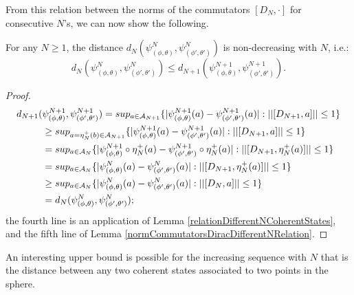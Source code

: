 From this relation between the norms of the commutators $[D_N, \cdot]$ for consecutive $N$'s, we can now show the following.

\begin{theorem}\label{nondecreasingDistanceRelatingNCoherent}
For any $N \geq 1$, the distance $d_N(\psi^N_{(\phi, \theta)}, \psi^N_{(\phi', \theta')})$ is non-decreasing with $N$, i.e.:
\begin{equation}
    d_N(\psi^N_{(\phi, \theta)}, \psi^N_{(\phi', \theta')}) \leq d_{N+1}(\psi^{N+1}_{(\phi, \theta)}, \psi^{N+1}_{(\phi', \theta')}).
\end{equation}
\end{theorem}
\begin{proof}
\begin{align*}
    d_{N+1}(&\psi^{N+1}_{(\phi, \theta)}, \psi^{N+1}_{(\phi', \theta')}) 
        = sup_{a \in \acal_{N+1}} \{|\psi^{N+1}_{(\phi, \theta)}(a) - \psi^{N+1}_{(\phi', \theta')}(a)| : ||[D_{N+1}, a]|| \leq 1\} \\
        &\geq sup_{a = \eta_N^+(b) \in \acal_{N+1}} \{|\psi^{N+1}_{(\phi, \theta)}(a) - \psi^{N+1}_{(\phi', \theta')}(a)| : ||[D_{N+1}, a]|| \leq 1\}\\
        &= sup_{a \in \acal_{N}} \{|\psi^{N+1}_{(\phi, \theta)}\circ \eta_N^+(a) - \psi^{N+1}_{(\phi', \theta')}\circ \eta_N^+(a)| : ||[D_{N+1},  \eta_N^+(a)]|| \leq 1\} \\
        &= sup_{a \in \acal_{N}} \{|\psi^{N}_{(\phi, \theta)}(a) - \psi^{N}_{(\phi', \theta')}(a)| : ||[D_{N+1}, \eta_N^+(a)]|| \leq 1\}\\
        &\geq sup_{a \in \acal_{N}} \{|\psi^{N}_{(\phi, \theta)}(a) - \psi^{N}_{(\phi', \theta')}(a)| : ||[D_{N}, a]|| \leq 1\} \\
        &= d_N(\psi^{N}_{(\phi, \theta)}, \psi^{N}_{(\phi', \theta')});
\end{align*} the fourth line is an application of Lemma \ref{relationDifferentNCoherentStates}, and the fifth line of Lemma \ref{normCommutatorsDiracDifferentNRelation}.
\end{proof}

\lin

An interesting upper bound is possible for the increasing sequence with $N$ that is the distance between any two coherent states associated to two points in the sphere.

